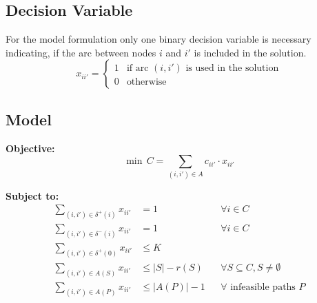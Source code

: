 \subsection*{Decision Variable}
For the model formulation only one binary decision variable is necessary indicating, if the arc
between nodes $i$ and $i'$ is included in the solution.
\[
	x_{ii'} =
	\begin{cases}
		1 & \text{if arc } (i,i') \text{ is used in the solution} \\
		0 & \text{otherwise}
	\end{cases}
\]
\clearpage

\subsection*{Model}
\textbf{Objective:}
\begin{equation}
	\label{eq:objective}
	\min \, C = \sum_{(i,i')\in A} c_{ii'}\cdot x_{ii'}
\end{equation}

\textbf{Subject to:}
\begin{align}
	\sum_{(i,i')\in \delta^+(i)} x_{ii'} & = 1                                                                                  &  & \forall i \in C                         \label{eq:flowout}     \\
	\sum_{(i,i')\in \delta^-(i)} x_{ii'} & = 1                                                                                  &  & \forall i \in C                         \label{eq:flowin}      \\
	\sum_{(i,i')\in \delta^+(0)} x_{ii'} & \leq K                                                       \label{eq:vehiclelimit}                                                                     \\
	\sum_{(i,i')\in A(S)} x_{ii'}        & \leq |S| - r(S)                                                                      &  & \forall S \subseteq C, S \neq \emptyset \label{eq:capacitycut} \\
	\sum_{(i,i')\in A(P)} x_{ii'}        & \leq |A(P)| - 1                                                                      &  & \forall \text{ infeasible paths } P     \label{eq:pathelim}
\end{align}

